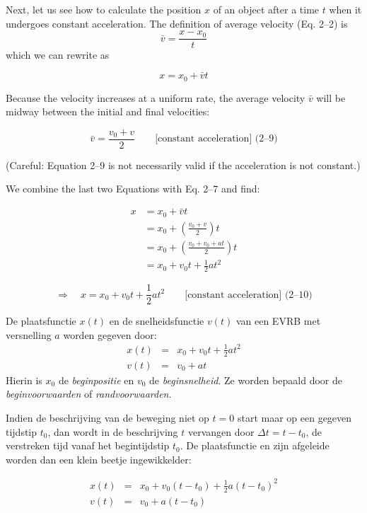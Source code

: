 \documentclass{ximera}
\begin{document}
Next, let us see how to calculate the position \( x \) of an object after a time \( t \) when it undergoes constant acceleration. The definition of average velocity (Eq. 2–2) is
\[
\bar{v} = \frac{x - x_0}{t}
\]
which we can rewrite as

\[
x = x_0 + \bar{v}t \tag{2–8}
\]

Because the velocity increases at a uniform rate, the average velocity \( \bar{v} \) will be midway between the initial and final velocities:

\[
\bar{v} = \frac{v_0 + v}{2} \qquad \text{[constant acceleration] (2–9)}
\]

(Careful: Equation 2–9 is not necessarily valid if the acceleration is not constant.)

We combine the last two Equations with Eq. 2–7 and find:

\begin{align*}
x &= x_0 + \bar{v}t \\
  &= x_0 + \left( \frac{v_0 + v}{2} \right)t \\
  &= x_0 + \left( \frac{v_0 + v_0 + at}{2} \right)t \\
  &= x_0 + v_0 t + \frac{1}{2} at^2
\end{align*}

\[
\Rightarrow \quad x = x_0 + v_0 t + \frac{1}{2}at^2 \qquad \text{[constant acceleration] (2–10)}
\]




\begin{theorem}
De plaatsfunctie $x(t)$ en de snelheidsfunctie $v(t)$ van een EVRB met versnelling $a$ worden gegeven door:
\[
\begin{array}{rcl}
x(t)&=&x_0+v_0t+\frac{1}{2}at^2\\
v(t)&=&v_0+at
\end{array}
\]
Hierin is $x_0$ de \textit{beginpositie} en $v_0$ de \textit{beginsnelheid}. Ze worden bepaald door de \textit{beginvoorwaarden} of \textit{randvoorwaarden}.
\end{theorem}	

Indien de beschrijving van de beweging niet op $t=0$ start maar op een gegeven tijdstip $t_0$, dan wordt in de beschrijving $t$ vervangen door $\Delta t= t-t_0$, de verstreken tijd vanaf het begintijdstip $t_0$. De plaatsfunctie en zijn afgeleide worden dan een klein beetje ingewikkelder:

\[
\begin{array}{rcl}
x(t)&=&x_0+v_0(t-t_0)+\frac{1}{2}a(t-t_0)^2\\
v(t)&=&v_0+a(t-t_0)
\end{array}
\]
\end{document}
